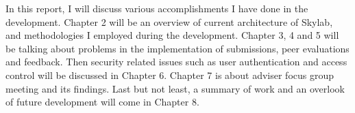 In this report, I will discuss various accomplishments I have done in the development. Chapter 2 will be an overview of current architecture of Skylab, and methodologies I employed during the development. Chapter 3, 4 and 5 will be talking about problems in the implementation of submissions, peer evaluations and feedback. Then security related issues such as user authentication and access control will be discussed in Chapter 6. Chapter 7 is about adviser focus group meeting and its findings. Last but not least, a summary of work and an overlook of future development will come in Chapter 8.
